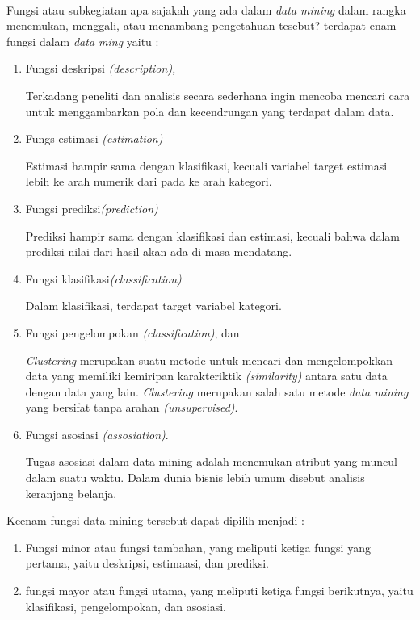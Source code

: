 \paragraph{} Fungsi atau subkegiatan apa sajakah yang ada dalam \textit{data mining} dalam rangka menemukan, menggali, atau menambang pengetahuan tesebut? terdapat enam fungsi dalam \textit{data ming} yaitu : \cite{tampubolon2013implementasi}
\begin{enumerate}
    \item Fungsi deskripsi \textit{(description),}
    \par Terkadang peneliti dan analisis secara sederhana ingin mencoba mencari cara untuk menggambarkan pola dan kecendrungan yang terdapat dalam data.
     \item Fungs estimasi \textit{(estimation)}
     \par Estimasi hampir sama dengan klasifikasi, kecuali variabel target estimasi lebih ke arah numerik dari pada ke arah kategori. 
      \item Fungsi prediksi\textit{(prediction)}
      \par Prediksi hampir sama dengan klasifikasi dan estimasi, kecuali bahwa dalam prediksi nilai dari hasil akan ada di masa mendatang. 
       \item Fungsi klasifikasi\textit{(classification)}
       \par Dalam klasifikasi, terdapat target variabel kategori. 
        \item  Fungsi pengelompokan \textit{(classification)}, dan
       \par  \textit{Clustering} merupakan suatu metode untuk mencari dan mengelompokkan data yang memiliki kemiripan karakteriktik \textit{(similarity)} antara satu data dengan data yang lain. \textit{Clustering} merupakan salah satu metode \textit{data mining} yang bersifat tanpa arahan \textit{(unsupervised)}.
         \item Fungsi asosiasi \textit{(assosiation)}.
         \par Tugas asosiasi dalam data mining adalah menemukan atribut yang muncul dalam suatu waktu. Dalam dunia bisnis lebih umum disebut analisis keranjang belanja. 
         
     
\end{enumerate}
  \par Keenam   fungsi data mining tersebut dapat dipilih menjadi :
  \begin{enumerate}
      \item Fungsi minor atau fungsi tambahan, yang meliputi ketiga fungsi yang pertama, yaitu deskripsi, estimaasi, dan prediksi.
       \item fungsi mayor atau fungsi utama, yang meliputi ketiga fungsi berikutnya, yaitu klasifikasi, pengelompokan, dan asosiasi.
       
       
  \end{enumerate}
